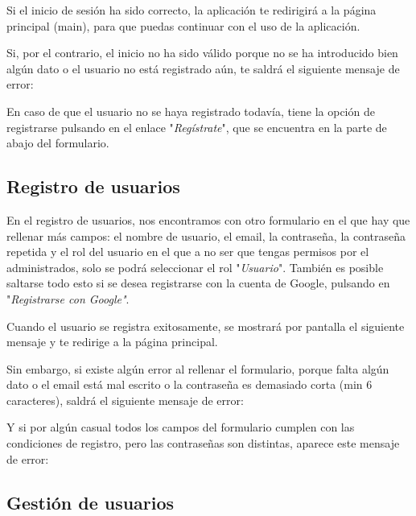 
Si el inicio de sesión ha sido correcto, la aplicación te redirigirá a la página principal (main), para que puedas continuar con el uso de la aplicación.

Si, por el contrario, el inicio no ha sido válido porque no se ha introducido bien algún dato o el usuario no está registrado aún, te saldrá el siguiente mensaje de error:

En caso de que el usuario no se haya registrado todavía, tiene la opción de registrarse pulsando en el enlace "\textit{Regístrate}", que se encuentra en la parte de abajo del formulario.

\hfill

\subsection{Registro de usuarios}

En el registro de usuarios, nos encontramos con otro formulario en el que hay que rellenar más campos: el nombre de usuario, el email, la contraseña, la contraseña repetida y el rol del usuario en el que a no ser que tengas permisos por el administrados, solo se podrá seleccionar el rol "\textit{Usuario}". También es posible saltarse todo esto si se desea registrarse con la cuenta de Google, pulsando en "\textit{Registrarse con Google"}.


Cuando el usuario se registra exitosamente, se mostrará por pantalla el siguiente mensaje y te redirige a la página principal.

Sin embargo, si existe algún error al rellenar el formulario, porque falta algún dato o el email está mal escrito o la contraseña es demasiado corta (min 6 caracteres), saldrá el siguiente mensaje de error:

Y si por algún casual todos los campos del formulario cumplen con las condiciones de registro, pero las contraseñas son distintas, aparece este mensaje de error:


\subsection{Gestión de usuarios}

